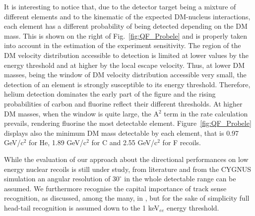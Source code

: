 \documentclass[physics,article,submit,moreauthors,pdftex]{Definitions/mdpi}
\begin{document}
It is interesting to notice that, due to the detector target being a mixture of different elements and to the kinematic of the expected DM-nucleus interactions, each element has a different probability of being detected depending on the DM mass. 
This is shown on the right of Fig.~\ref{fig:QF_Probele} and is properly taken into account in the estimation of the experiment sensitivity. The region of the DM velocity distribution accessible to detection is limited at lower values by the energy threshold and at higher by the local escape velocity. Thus, at lower DM masses, being the window of DM velocity distribution accessible very small, the detection of an element is strongly susceptible to its energy threshold. Therefore, helium detection dominates the early part of the figure and the rising probabilities of carbon and fluorine reflect their different thresholds. At higher DM masses, when  the window is quite large, the A$^2$ term in the rate calculation prevails, rendering fluorine the most detectable element. Figure~\ref{fig:QF_Probele} displays also the minimum DM mass detectable by each element, that is 0.97 GeV/c$^2$ for He, 1.89 GeV/c$^2$ for C and 2.55 GeV/c$^2$ for F recoils.


 
 While the evaluation of our approach about the directional performances on low energy nuclear recoils is still under study, from literature \cite{Nakamura:2012zza} and from the CYGNUS simulation \cite{Vahsen:2020pzb} an angular 
resolution of $30^\circ$ in the whole 
detectable range can be assumed.
We furthermore recognise the capital importance of track sense recognition, as discussed, among the many, in \cite{Mayet:2016zxu, Vahsen:2020pzb}, but for the sake of simplicity full head-tail recognition is assumed down to the 1 keV$_{ee}$ energy threshold.
 
\end{document}
